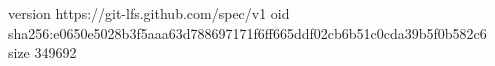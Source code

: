 version https://git-lfs.github.com/spec/v1
oid sha256:e0650e5028b3f5aaa63d788697171f6ff665ddf02cb6b51c0cda39b5f0b582c6
size 349692
